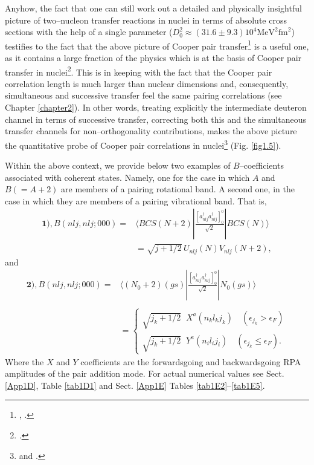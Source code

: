 Anyhow, the fact that one can still work out a detailed and physically insightful picture of two--nucleon transfer reactions in nuclei in terms of absolute cross sections with the help of a single parameter ($D_0^2\approx(31.6\pm 9.3)10^4 \text{MeV}^2\text{fm}^2$) testifies to the fact that the above picture of Cooper pair transfer\footnote{\cite{Glendenning:65}, \cite{Bayman:67}.} is a useful one, as it contains a large fraction of the physics which is at the basis of Cooper pair transfer in nuclei\footnote{\cite{Broglia:73}.}. This is in keeping with the fact that the Cooper pair correlation length is much larger than nuclear dimensions and, consequently, simultaneous and successive transfer feel the same pairing correlations (see Chapter \ref{chapter2}). In other words, treating explicitly the intermediate deuteron channel in terms of successive transfer, correcting both this and the simultaneous transfer channels for non--orthogonality contributions, makes the above picture the quantitative probe of Cooper pair correlations in nuclei\footnote{\cite{Bayman:82} and \cite{Potel:13}.} (Fig. \ref{fig1.5}).


 Within the above context, we provide below two examples of $B$--coefficients associated with coherent states. Namely, one for the case in which $A$ and $B(=A+2)$ are members of a pairing rotational band. A second one, in the case in which they are members of a pairing vibrational band. That is, 
\begin{equation}\label{eqC21.8}
\begin{split}
\mathbf{1)}, B(nlj,nlj;000)=&\langle BCS(N+2)|\frac{[a^\dagger_{nlj}a^\dagger_{nlj}]^0_0}{\sqrt{2}}|BCS(N)\rangle\\
&=\sqrt{j+1/2}\,U_{nlj}(N)V_{nlj}(N+2),
\end{split}
\end{equation}
and
\begin{equation}
\begin{split}
\mathbf{2)}, B(nlj,nlj;000)=&\langle (N_0+2)(gs)|\frac{[a^\dagger_{nlj}a^\dagger_{nlj}]^0_0}{\sqrt{2}}|N_0(gs)\rangle \\
&\\
&=\left\{\begin{array}{c}
 \sqrt{j_k+1/2}\;\;X^a(n_kl_kj_k)\quad (\epsilon_{j_k}>\epsilon_F) \\ 
\sqrt{j_k+1/2}\;\;Y^a(n_il_ij_i)\quad (\epsilon_{j_k}\leq\epsilon_F).
\end{array} \right.
\end{split}
\end{equation}
Where the $X$ and $Y$ coefficients are the forwardsgoing and backwardsgoing RPA amplitudes of the pair addition mode.
For actual numerical values see Sect. \ref{App1D}, Table \ref{tab1D1} and Sect. \ref{App1E} Tables \ref{tab1E2}--\ref{tab1E5}.


